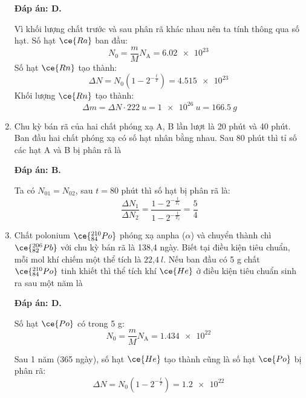 \begin{enumerate}[label=\bfseries Câu \arabic*:]
\loigiai
{		\textbf{Đáp án: D.}

Vì khối lượng chất trước và sau phân rã khác nhau nên ta tính thông qua số hạt.
Số hạt $\ce{Ra}$ ban đầu:
$$N_0 = \dfrac{m}{M} N_\text{A} = \SI{6.02e23}{}$$
Số hạt $\ce{Rn}$ tạo thành:
$$\Delta N = N_0 (1-2^{-\frac{t}{T}}) = \SI{4.515e23}{}$$
Khối lượng $\ce{Rn}$ tạo thành:
$$\Delta m = \Delta N \cdot \SI{222}{u} = \SI{1e26}{u} = \SI{166.5}{g}$$
}


	\item {}
	\cauhoi
	{Chu kỳ bán rã của hai chất phóng xạ A, B lần lượt là 20 phút và 40 phút. Ban đầu hai chất phóng xạ có số hạt nhân bằng nhau. Sau 80 phút thì tỉ số các hạt A và B bị phân rã là
	}
	
	\loigiai
	{		\textbf{Đáp án: B.}
		
		Ta có $N_{0 1} = N_{0 2}$, sau $t=80$ phút thì số hạt bị phân rã là:
		$$\dfrac{\Delta N_1}{\Delta N_2} = \dfrac{1-2^{-\frac{t}{T_1}}}{1-2^{-\frac{t}{T_2}}}=\dfrac{5}{4}$$
		
	}

	\item {}
	\cauhoi
	{Chất polonium $\ce{^{210}_{84} Po}$ phóng xạ anpha ($\alpha$) và chuyển thành chì $\ce{^{206}_{82} Pb}$ với chu kỳ bán rã là 138,4 ngày. Biết tại điều kiện tiêu chuẩn, mỗi mol khí chiếm một thể tích là $\text{22,4}\ l$. Nếu ban đầu có 5 g chất $\ce{^{210}_{84} Po}$ tinh khiết thì thể tích khí $\ce{He}$ ở điều kiện tiêu chuẩn sinh ra sau một năm là
	}
	
	\loigiai
	{		\textbf{Đáp án: D.}
		
		Số hạt $\ce{Po}$ có trong 5 g:
		$$N_0 = \dfrac{m}{M} N_\text{A} = \SI{1.434e22}{}$$
		
		Sau 1 năm (365 ngày), số hạt $\ce{He}$ tạo thành cũng là số hạt $\ce{Po}$ bị phân rã:
		$$\Delta N = N_0 (1-2^{-\frac{t}{T}}) = \SI{1.2e22}{}$$
		
}
\end{enumerate}
